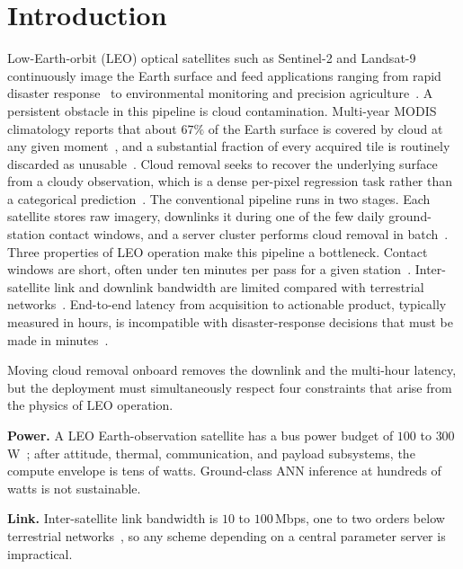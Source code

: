 \documentclass[conference]{IEEEtran}
\begin{document}
\section{Introduction}\label{sec:intro}

Low-Earth-orbit (LEO) optical satellites such as Sentinel-2 and
Landsat-9 continuously image the Earth surface and feed applications
ranging from rapid disaster response~\cite{ref:earthobs2} to
environmental monitoring and precision
agriculture~\cite{ref:earthobs1}. A persistent obstacle in this
pipeline is cloud contamination. Multi-year MODIS climatology reports
that about $67\%$ of the Earth surface is covered by cloud at any
given moment~\cite{ref:king2013cloud}, and a substantial fraction of
every acquired tile is routinely discarded as
unusable~\cite{ref:cuhkcr,ref:ebel2021multisensor}. Cloud removal
seeks to recover the underlying surface from a cloudy observation,
which is a dense per-pixel regression task rather than a categorical
prediction~\cite{ref:cuhkcr}. The conventional pipeline runs in two
stages. Each satellite stores raw imagery, downlinks it during one
of the few daily ground-station contact windows, and a server cluster
performs cloud removal in
batch~\cite{ref:earthobs1,ref:onboardfl-bottleneck}. Three properties
of LEO operation make this pipeline a bottleneck. Contact windows are
short, often under ten minutes per pass for a given
station~\cite{ref:onboardfl-bottleneck}. Inter-satellite link and
downlink bandwidth are limited compared with terrestrial
networks~\cite{ref:spacecpn1}. End-to-end latency from acquisition to
actionable product, typically measured in hours, is incompatible with
disaster-response decisions that must be made in
minutes~\cite{ref:earthobs2}.

Moving cloud removal onboard removes the downlink and the multi-hour
latency, but the deployment must simultaneously respect four
constraints that arise from the physics of LEO operation.

\textbf{Power.} A LEO Earth-observation satellite has a bus power
budget of $100$ to $300$\,W~\cite{ref:spacecpn1}; after attitude,
thermal, communication, and payload subsystems, the compute envelope
is tens of watts. Ground-class ANN inference at hundreds of watts is
not sustainable.

\textbf{Link.} Inter-satellite link bandwidth is $10$ to $100$\,Mbps,
one to two orders below terrestrial
networks~\cite{ref:spacecpn1,ref:onboardfl-bottleneck}, so any scheme
depending on a central parameter server is impractical.
\end{document}
